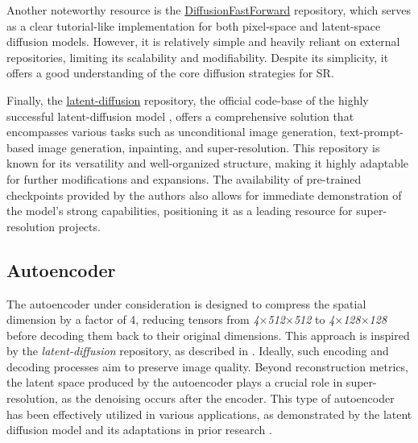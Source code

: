 Another noteworthy resource is the \href{https://github.com/mikonvergence/DiffusionFastForward}{DiffusionFastForward} repository, which serves as a clear tutorial-like implementation for both pixel-space and latent-space diffusion models. However, it is relatively simple and heavily reliant on external repositories, limiting its scalability and modifiability. Despite its simplicity, it offers a good understanding of the core diffusion strategies for SR.

Finally, the \href{https://github.com/mikonvergence/DiffusionFastForward}{latent-diffusion} repository, the official code-base of the highly successful latent-diffusion model \autocite{rombach2022highresolution}, offers a comprehensive solution that encompasses various tasks such as unconditional image generation, text-prompt-based image generation, inpainting, and super-resolution. This repository is known for its versatility and well-organized structure, making it highly adaptable for further modifications and expansions. The availability of pre-trained checkpoints provided by the authors also allows for immediate demonstration of the model’s strong capabilities, positioning it as a leading resource for super-resolution projects.


\subsection{Autoencoder}

The autoencoder under consideration is designed to compress the spatial dimension by a factor of 4, reducing tensors from \textit{4$\times$512$\times$512} to \textit{4$\times$128$\times$128} before decoding them back to their original dimensions. This approach is inspired by the \textit{latent-diffusion} repository, as described in \autocite{rombach2022highresolution}. Ideally, such encoding and decoding processes aim to preserve image quality. Beyond reconstruction metrics, the latent space produced by the autoencoder plays a crucial role in super-resolution, as the denoising occurs after the encoder. This type of autoencoder has been effectively utilized in various applications, as demonstrated by the latent diffusion model and its adaptations in prior research \autocite{esser2021taming}.

